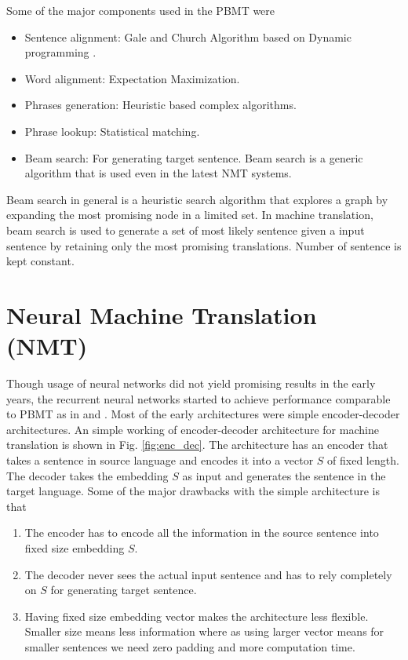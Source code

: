 \documentclass[a4paper]{article}
\begin{document}
Some of the major components used in the PBMT were


\begin{itemize}
  \item Sentence  alignment:   Gale   and  Church  Algorithm  based  on  Dynamic
        programming \cite{lewis1994sequential}.
  \item Word alignment: Expectation Maximization.
  \item Phrases generation: Heuristic based complex algorithms.
  \item Phrase lookup: Statistical matching.
  \item Beam search:  For generating target sentence.  Beam search is a generic
        algorithm that is used even in the latest NMT systems.
\end{itemize}


Beam search in general is a heuristic search  algorithm that explores a graph by
expanding the most promising node in a limited set. In machine translation, beam
search is used to generate  a set of most likely sentence given a input sentence
by retaining  only the most promising  translations. Number of sentence  is kept
constant.


\section{Neural Machine Translation (NMT)}
Though usage of  neural networks did  not  yield  promising results in the early
years, the recurrent neural networks started to  achieve  performance comparable
to       PBMT       as       in       \cite{kalchbrenner2013recurrent}       and
\cite{hermann2013multilingual}. Most  of  the  early architectures  were  simple
encoder-decoder architectures. An simple working of encoder-decoder architecture
for machine translation is shown in Fig. \ref{fig:enc_dec}. The architecture has
an encoder that takes a sentence in source language and encodes it into a vector
$S$ of fixed length. The decoder takes the embedding $S$ as  input and generates
the sentence in the target language. Some of the major drawbacks with the simple
architecture is that


\begin{enumerate}
  \item The  encoder  has to  encode all the  information in the source sentence
        into fixed size embedding $S$.
  \item The decoder  never  sees  the  actual  input  sentence  and  has to rely
        completely on $S$ for generating target sentence.
  \item Having fixed size embedding vector makes the architecture less flexible.
        Smaller size means less  information where  as using larger vector means
        for smaller sentences we need zero padding and more computation time.
\end{enumerate}
\end{document}
